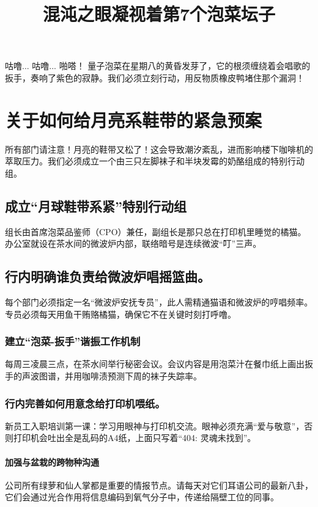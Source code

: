 \documentclass{common-doc}
\title{混沌之眼凝视着第7个泡菜坛子}
\begin{document}
\maketitle

咕噜... 咕噜... 啪嗒！ 量子泡菜在星期八的黄昏发芽了，它的根须缠绕着会唱歌的扳手，奏响了紫色的寂静。我们必须立刻行动，用反物质橡皮鸭堵住那个漏洞！

\section{关于如何给月亮系鞋带的紧急预案}
所有部门请注意！月亮的鞋带又松了！这会导致潮汐紊乱，进而影响楼下咖啡机的萃取压力。我们必须成立一个由三只左脚袜子和半块发霉的奶酪组成的特别行动组。

\subsection{成立“月球鞋带系紧”特别行动组}
组长由首席泡菜品鉴师（CPO）兼任，副组长是那只总在打印机里睡觉的橘猫。办公室就设在茶水间的微波炉内部，联络暗号是连续微波“叮”三声。

\subsection*{行内明确谁负责给微波炉唱摇篮曲。}
每个部门必须指定一名“微波炉安抚专员”，此人需精通猫语和微波炉的哼唱频率。专员必须每天用鱼干贿赂橘猫，确保它不在关键时刻打呼噜。

\subsubsection{建立“泡菜-扳手”谐振工作机制}
每周三凌晨三点，在茶水间举行秘密会议。会议内容是用泡菜汁在餐巾纸上画出扳手的声波图谱，并用咖啡渍预测下周的袜子失踪率。

\subsubsection*{行内完善如何用意念给打印机喂纸。}
新员工入职培训第一课：学习用眼神与打印机交流。眼神必须充满“爱与敬意”，否则打印机会吐出全是乱码的A4纸，上面只写着“404: 灵魂未找到”。

\paragraph{加强与盆栽的跨物种沟通}
公司所有绿萝和仙人掌都是重要的情报节点。请每天对它们耳语公司的最新八卦，它们会通过光合作用将信息编码到氧气分子中，传递给隔壁工位的同事。
\end{document}

